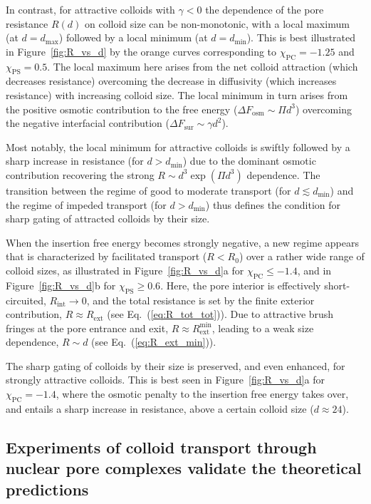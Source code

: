 \documentclass[12pt, a4paper]{article}
\begin{document}
In contrast, for attractive colloids with $\gamma <0$ the dependence of the pore resistance $R(d)$ on colloid size can be non-monotonic, with a local maximum (at $d=d_\text{max}$) followed by a local minimum (at $d=d_\text{min}$).
This is best illustrated in Figure~\ref{fig:R_vs_d} by the orange curves corresponding to $\chi_{\text{PC}} = -1.25$ and $\chi_{\text{PS}}=0.5$.
The local maximum here arises from the net colloid attraction (which decreases resistance) overcoming the decrease in diffusivity (which increases resistance) with increasing colloid size.
The local minimum in turn arises from the positive osmotic contribution to the free energy ($\Delta F_{\text{osm}} \sim \Pi d^3$) overcoming the negative interfacial contribution ($\Delta F_{\text{sur}} \sim \gamma d^2$).

Most notably, the local minimum for attractive colloids is swiftly followed by a sharp increase in resistance (for $d > d_{\text{min}}$) due to the dominant osmotic contribution recovering the strong $R \sim d^3 \exp(\Pi d^3)$ dependence.
The transition between the regime of good to moderate transport (for $d \lesssim d_{\text{min}}$) and the regime of impeded transport (for $d > d_{\text{min}}$) thus defines the condition for sharp gating of attracted colloids by their size.

When the insertion free energy becomes strongly negative, a new regime appears that is characterized by facilitated transport ($R < R_0$) over a rather wide range of colloid sizes, as illustrated in 
Figure~\ref{fig:R_vs_d}a for $\chi_{\text{PC}} \le -1.4$, and in Figure~\ref{fig:R_vs_d}b for $\chi_{\text{PS}} \ge 0.6$.
Here, the pore interior is effectively short-circuited, $R_{\text{int}} \to 0$, and the total resistance is set by the finite exterior contribution, $R \approx R_{\text{ext}}$ (see Eq.~(\ref{eq:R_tot_tot})).
Due to attractive brush fringes at the pore entrance and exit, $R \approx R_{\text{ext}}^{\text{min}}$, leading to a weak size dependence, $R \sim d$ (see Eq.~(\ref{eq:R_ext_min})).

The sharp gating of colloids by their size is preserved, and even enhanced, for strongly attractive colloids.
This is best seen in Figure~\ref{fig:R_vs_d}a for $\chi_\text{PC}= -1.4$, where the osmotic penalty to the insertion free energy takes over, and entails a sharp increase in resistance, above a certain colloid size ($d \approx 24$).


\subsection{Experiments of colloid transport through nuclear pore complexes validate the theoretical predictions}
\end{document}
